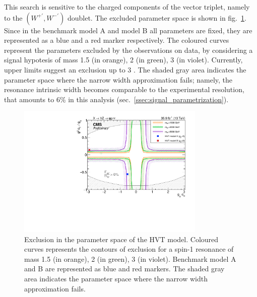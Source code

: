 \noindent This search is sensitive to the charged components of the vector triplet, namely to the $(W^{+'}, W^{-'})$ doublet. The excluded parameter space is shown in fig.~\ref{fig:interpretation}. Since in the benchmark model A and model B all parameters are fixed, they are represented as a blue and a red marker respectively. The coloured curves represent the parameters excluded by the observations on data, by considering a signal hypotesis of mass 1.5 \TeV (in orange), 2 \TeV (in green), 3 \TeV (in violet). Currently, upper limits suggest an exclusion up to 3 \TeV. The shaded gray area indicates the parameter space where the narrow width approximation fails; namely, the resonance intrinsic width becomes comparable to the experimental resolution, that amounts to 6\% in this analysis (sec.~\ref{ssec:signal_parametrization}).

\begin{figure}[!h]
 \begin{center}
   \includegraphics[width=0.8\textwidth]{v9/plotsAlpha/Limits/HVT_XVZ_Wprime.pdf}
   \caption{Exclusion in the parameter space of the HVT model. Coloured curves represents the contours of exclusion for a spin-1 \Wp resonance of mass 1.5 \TeV (in orange), 2 \TeV (in green), 3 \TeV (in violet). Benchmark model A and B are represented as blue and red markers. The shaded gray area indicates the parameter space where the narrow width approximation fails.}
   \label{fig:interpretation}
 \end{center}
\end{figure}

\clearpage

